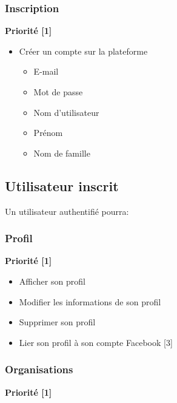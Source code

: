 \documentclass[11pt, a4paper, french, twoside]{article}
\begin{document}
			\subsubsection{Inscription}
			\label{subsubsec:inscription}
			
				\textbf{Priorité [1]}
			
				\begin{itemize}
					\item Créer un compte sur la plateforme
						\begin{itemize}
							\item E-mail
							\item Mot de passe
							\item Nom d'utilisateur
							\item Prénom
							\item Nom de famille
						\end{itemize}
				\end{itemize}
		
		\subsection{Utilisateur inscrit}
		\label{subsec:utilisateur_inscrit}
			Un utilisateur authentifié pourra:
			
			\subsubsection{Profil}
			\label{subsubsec:profil}
				
				\textbf{Priorité [1]}
			
				\begin{itemize}
					\item Afficher son profil
					\item Modifier les informations de son profil
					\item Supprimer son profil
					\item Lier son profil à son compte Facebook [3]
				\end{itemize}
			
			\subsubsection{Organisations}
			\label{subsubsec:organisations}
				
				\textbf{Priorité [1]}
			
\end{document}
